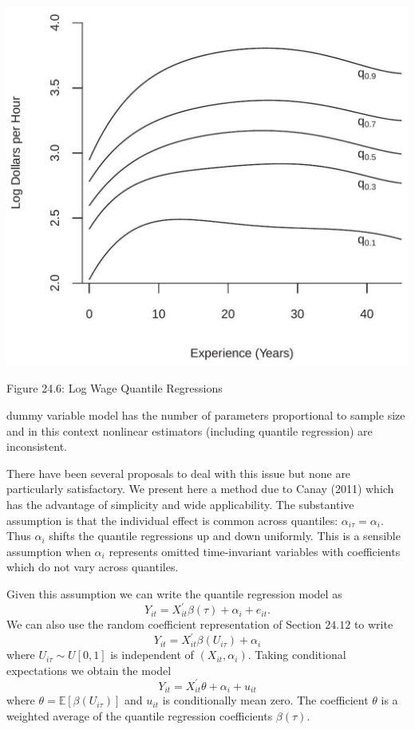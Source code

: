 \documentclass[10pt]{article}
\begin{document}
\includegraphics[max width=\textwidth]{2022_10_23_47027c652ef567187a65g-18}

Figure 24.6: Log Wage Quantile Regressions

dummy variable model has the number of parameters proportional to sample size and in this context nonlinear estimators (including quantile regression) are inconsistent.

There have been several proposals to deal with this issue but none are particularly satisfactory. We present here a method due to Canay (2011) which has the advantage of simplicity and wide applicability. The substantive assumption is that the individual effect is common across quantiles: $\alpha_{i \tau}=\alpha_{i}$. Thus $\alpha_{i}$ shifts the quantile regressions up and down uniformly. This is a sensible assumption when $\alpha_{i}$ represents omitted time-invariant variables with coefficients which do not vary across quantiles.

Given this assumption we can write the quantile regression model as
$$
Y_{i t}=X_{i t}^{\prime} \beta(\tau)+\alpha_{i}+e_{i t} .
$$
We can also use the random coefficient representation of Section $24.12$ to write
$$
Y_{i t}=X_{i t}^{\prime} \beta\left(U_{i \tau}\right)+\alpha_{i}
$$
where $U_{i \tau} \sim U[0,1]$ is independent of $\left(X_{i t}, \alpha_{i}\right)$. Taking conditional expectations we obtain the model
$$
Y_{i t}=X_{i t}^{\prime} \theta+\alpha_{i}+u_{i t}
$$
where $\theta=\mathbb{E}\left[\beta\left(U_{i \tau}\right)\right]$ and $u_{i t}$ is conditionally mean zero. The coefficient $\theta$ is a weighted average of the quantile regression coefficients $\beta(\tau)$.
\end{document}
